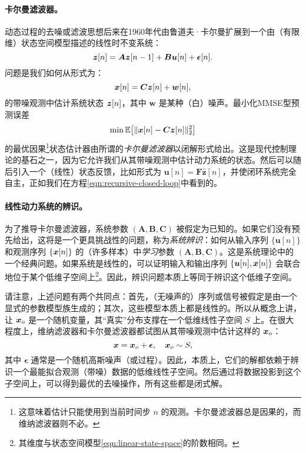 \documentclass[../../book-main_zh.tex]{subfiles}
\begin{document}
\paragraph{卡尔曼滤波器。} 
动态过程的去噪或滤波思想后来在1960年代由鲁道夫·卡尔曼扩展到一个由（有限维）状态空间模型描述的线性时不变系统：
\begin{equation}
    \bm{z}[n] = \boldsymbol{A} \bm{z}[n-1] + \boldsymbol{B}\boldsymbol{u}[n] + \boldsymbol{\epsilon}[n]. 
    \label{eqn:linear-state-space}
\end{equation}
问题是我们如何从形式为：\begin{equation}\bm{x}[n] = \boldsymbol{C} \bm{z}[n] + \boldsymbol{w}[n],
\label{eqn:Kalman-model}
\end{equation}
的带噪观测中估计系统状态 $\bm{z}[n]$，其中 $\boldsymbol{w}$ 是某种（白）噪声。最小化MMSE型预测误差
\begin{equation}
    \min \mathbb{E}\big[ \|\bm{x}[n] - \boldsymbol{C}\bm{z}[n]\|_2^2\big]
\end{equation}
的最优因果\footnote{这意味着估计只能使用到当前时间步 $n$ 的观测。卡尔曼滤波器总是因果的，而维纳滤波器则不必。}状态估计器由所谓的{\em 卡尔曼滤波器}\cite{kalman1960new}以闭解形式给出。这是现代控制理论的基石之一，因为它允许我们从其带噪观测中估计动力系统的状态。然后可以随后引入一个（线性）状态反馈，比如形式为 $\boldsymbol{u}[n] = \boldsymbol{F} \hat{\boldsymbol{z}}[n]$，并使闭环系统完全自主，正如我们在方程\eqref{eqn:recursive-closed-loop}中看到的。

\paragraph{线性动力系统的辨识。}
为了推导卡尔曼滤波器，系统参数 $(\boldsymbol{A}, \boldsymbol{B}, \boldsymbol{C})$ 被假定为已知的。如果它们没有预先给出，这将是一个更具挑战性的问题，称为{\em 系统辨识}：如何从输入序列 $\{\boldsymbol{u}[n]\}$ 和观测序列 $\{\bm{x}[n]\}$ 的（许多样本）中{\em 学习}参数 $(\boldsymbol{A}, \boldsymbol{B}, \boldsymbol{C})$。这是系统理论中的一个经典问题。如果系统是线性的，可以证明输入和输出序列 $\{\boldsymbol{u}[n], \bm{x}[n]\}$ 会联合地位于某个低维子空间上\footnote{其维度与状态空间模型\eqref{eqn:linear-state-space}的阶数相同。}。因此，辨识问题本质上等同于辨识这个低维子空间\cite{OverscheeP1996,Liu-2009-CDC,Liu-2010-SIAM}。

请注意，上述问题有两个共同点：首先，（无噪声的）序列或信号被假定是由一个显式的参数模型族生成的；其次，这些模型本质上都是线性的。所以从概念上讲，让 $\bm{x}_o$ 是一个随机变量，其“真实”分布支撑在一个低维线性子空间 $S$ 上。在很大程度上，维纳滤波器和卡尔曼滤波器都试图从其带噪观测中估计这样的 $\bm{x}_o$：
\begin{equation}
    \bm{x} = \bm{x}_o + \boldsymbol{\epsilon}, \quad \bm{x}_o \sim S, 
\end{equation}
其中 $\boldsymbol{\epsilon}$ 通常是一个随机高斯噪声（或过程）。因此，本质上，它们的解都依赖于辨识一个最能拟合观测（带噪）数据的低维线性子空间。然后通过将数据投影到这个子空间上，可以得到最优的去噪操作，所有这些都是闭式解。
\end{document}
